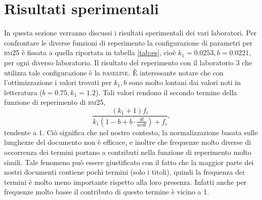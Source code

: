 \section{Risultati sperimentali}
\label{sec:risult-sper}

In questa sezione verranno discussi i risultati sperimentali dei vari laboratori. Per confrontare le diverse funzioni di reperimento la configurazione di parametri per \textsc{bm25} \`e fissata a quella riportata in tabella \ref{tab:es}, cio\`e $k_1 = 0.0253, b = 0.0221$, per ogni diverso laboratorio. Il risultato del reperimento con il laboratorio 3 che utilizza tale configurazione \`e la \textsc{baseline}.
\`E interessante notare che con l'ottimizzazione i valori trovati per $k_1, b$ sono molto lontani dai valori noti in letteratura ($b=0.75, k_1=1.2$). Tali valori rendono il secondo termine della funzione di reperimento di \textsc{bm25}, 
\[\frac{(k_1 + 1)f_i}{k_1(1-b+b \cdot \frac{dl}{avdl})+f_i},\] 
tendente a $1$. Ci\`o significa che nel nostro contesto, la normalizzazione basata sulle lunghezze del documento non \`e efficace, e inoltre che frequenze molto diverse di occorrenza dei termini portano a contributi nella funzione di reperimento molto simili. Tale fenomeno pu\`o essere giustificato con il fatto che la maggior parte dei nostri documenti contiene pochi termini (solo i titoli), quindi la frequenza dei termini \`e molto meno importante rispetto alla loro presenza. Infatti anche per frequenze molto basse il contributo di questo termine \`e vicino a 1.


